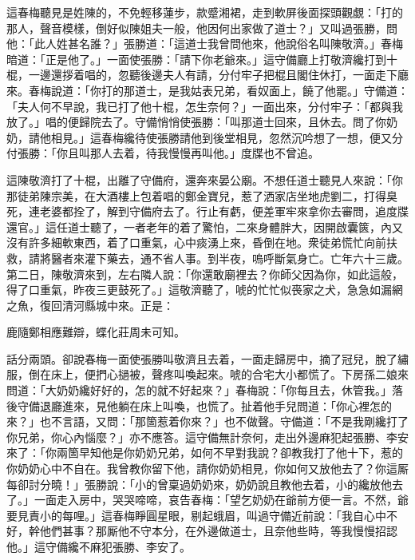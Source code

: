 這春梅聽見是姓陳的，{}不免輕移蓮步，款蹙湘裙，走到軟屏後面探頭觀覷：「打的那人，聲音模樣，倒好似陳姐夫一般，他因何出家做了道士？」又叫過張勝，問他：「此人姓甚名誰？」張勝道：「這道士我曾問他來，他說俗名叫陳敬濟。」春梅暗道：「正是他了。」{}一面使張勝：「請下你老爺來。」這守備廳上打敬濟纔打到十棍，一邊還拶着唱的，忽聽後邊夫人有請，分付牢子把棍且閣住休打，一面走下廳來。春梅說道：「你打的那道士，是我姑表兄弟，看奴面上，饒了他罷。」守備道：「夫人何不早說，我已打了他十棍，怎生奈何？」一面出來，分付牢子：「都與我放了。」唱的便歸院去了。守備悄悄使張勝：「叫那道士回來，且休去。問了你奶奶，請他相見。」這春梅纔待使張勝請他到後堂相見，忽然沉吟想了一想，便又分付張勝：「你且叫那人去着，待我慢慢再叫他。」{}度牒也不曾追。

這陳敬濟打了十棍，出離了守備府，還奔來晏公廟。不想任道士聽見人來說：「你那徒弟陳宗美，在大酒樓上包着唱的鄭金寶兒，惹了洒家店坐地虎劉二，打得臭死，連老婆都拴了，解到守備府去了。行止有虧，便差軍牢來拿你去審問，追度牒還官。」這任道士聽了，一者老年的着了驚怕，二來身體胖大，因開啟囊篋，內又沒有許多細軟東西，着了口重氣，心中痰湧上來，昏倒在地。衆徒弟慌忙向前扶救，請將醫者來灌下藥去，通不省人事。到半夜，嗚呼斷氣身亡。亡年六十三歲。{}第二日，陳敬濟來到，左右隣人說：「你還敢廟裡去？你師父因為你，如此這般，得了口重氣，昨夜三更鼓死了。」這敬濟聽了，唬的忙忙似䘮家之犬，急急如漏網之魚，復回清河縣城中來。正是：

\begin{myquote}
鹿隨鄭相應難辯，蝶化莊周未可知。
\end{myquote}

話分兩頭。卻說春梅一面使張勝叫敬濟且去着，一面走歸房中，摘了冠兒，脫了繡服，倒在床上，便捫心撾被，聲疼叫喚起來。{}唬的合宅大小都慌了。下房孫二娘來問道：「大奶奶纔好好的，怎的就不好起來？」春梅說：「你每且去，休管我。」落後守備退廳進來，見他躺在床上叫喚，也慌了。扯着他手兒問道：「你心裡怎的來？」也不言語，又問：「那箇惹着你來？」也不做聲。守備道：「不是我剛纔打了你兄弟，你心內惱麼？」亦不應答。{}這守備無計奈何，走出外邊麻犯起張勝、李安來了：「你兩箇早知他是你奶奶兄弟，如何不早對我說？卻教我打了他十下，惹的你奶奶心中不自在。我曾教你留下他，請你奶奶相見，你如何又放他去了？你這厮每卻討分曉！」張勝說：「小的曾稟過奶奶來，奶奶說且教他去着，小的纔放他去了。」一面走入房中，哭哭啼啼，哀告春梅：「望乞奶奶在爺前方便一言。不然，爺要見責小的每哩。」這春梅睜圓星眼，剔起蛾眉，叫過守備近前說：「我自心中不好，幹他們甚事？那厮他不守本分，在外邊做道士，且奈他些時，等我慢慢招認他。」{}這守備纔不麻犯張勝、李安了。

